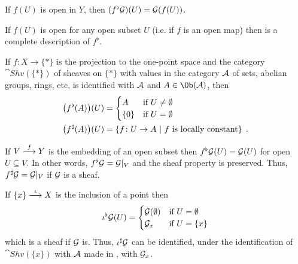 \documentclass[a4paper,parskip=half,numbers=enddot, DIV=12]{scrreprt}
\begin{document}
    \begin{example}
        \begin{alphanumerate}
          \item 
            If $f(U)$ is open in $Y$, then $(f^\flat\mathcal{G})(U) = \mathcal{G}(f(U))$.
          \item 
            If $f(U)$ is open for any open subset $U$ (i.e. if $f$ is an open map) then  is a complete description of $f^\flat$.
          \item 
            If $f\colon X\to \{*\}$ is the projection to the one-point space and the category $\cat{Shv}(\{*\})$ of sheaves on $\{*\}$ with values in the category $\mathcal{A}$ of sets, abelian groups, rings, etc, is identified with $\mathcal{A}$ and $A\in\Ob(\Aa)$, then 
            \begin{align*}
                \big(f^\flat(A)\big)(U) &= \begin{cases} A &\text{if }U\neq\emptyset\\ \{0\} &\text{if } U= \emptyset \end{cases}\\
                \big(f^\sharp(A)\big)(U) &= \left\{f\colon U \to A\ \middle|\  f \text{ is locally constant}\right\}\;.
            \end{align*}
          \item 
            If $V\morphism[f] Y$ is the embedding of an open subset then $f^\flat \mathcal{G}(U) = \mathcal{G}(U)$ for open $U\subseteq V$. In other words, $f^\flat \mathcal{G} = \mathcal{G}|_V$ and the sheaf property is preserved. Thus, $f^\sharp \mathcal{G} = \mathcal{G}|_V$ if $\mathcal{G}$ is a sheaf.
          \item 
            If $\{x\} \morphism[\iota] X$ is the inclusion of a point then 
            \begin{align*}
                \iota^\flat\mathcal{G}(U) = \begin{cases} \mathcal{G}(\emptyset) & \text{if }U = \emptyset \\ \mathcal{G}_x&\text{if }U = \{x\}\end{cases}
            \end{align*}
            which is a sheaf if $\mathcal{G}$ is. Thus, $\iota^\sharp\mathcal{G}$ can be identified, under the identification of $\cat{Shv}(\{x\})$ with $\mathcal{A}$ made in , with $\mathcal{G}_x$.
        \end{alphanumerate}
    \end{example}
\end{document}
